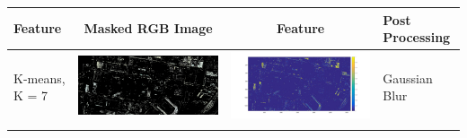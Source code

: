 \documentclass[fleqn,10pt]{SelfArx} %
\begin{document}
\begin{table}
\centering
\begin{tabular}{>{\centering\arraybackslash}M{8mm}cc>{\centering\arraybackslash}M{20mm}}
\toprule
Feature & Masked RGB Image & Feature & Post Processing \\ 
\midrule 
\vspace{-3cm}
\hspace{-0.6cm}
K-means, K = 7 & \includegraphics[clip,scale=0.07]{7rgb.jpg} & \includegraphics[trim={6cm 2.5cm 4.5cm 1.6cm},clip,scale=0.18]{7.jpg} & \vspace{-3cm}Gaussian Blur \\ 
\midrule 
\vspace{-3cm}
\hspace{-0.6cm}

\end{tabular}
\end{table}
\end{document}
